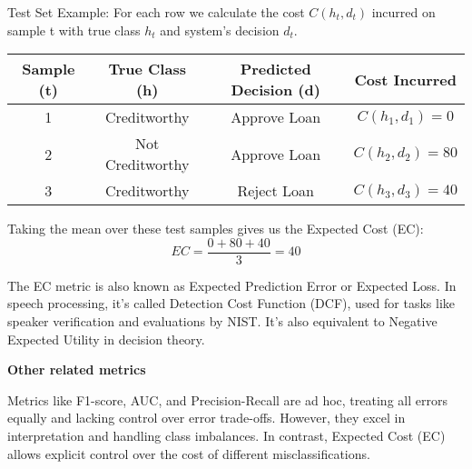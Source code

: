 Test Set Example: For each row we calculate the cost $C(h_t, d_t)$ incurred on sample t with true class $h_t$ and system’s decision $d_t$.

\begin{center}
\begin{tabular}{|c|c|c|c|}
\hline
Sample (t)& True Class (h) & Predicted Decision (d) & Cost Incurred \\
\hline
1 & Creditworthy & Approve Loan & $C(h_1, d_1) = 0$ \\
\hline
2 & Not Creditworthy & Approve Loan & $C(h_2, d_2) = 80$ \\
\hline
3 & Creditworthy & Reject Loan & $C(h_3, d_3) = 40$ \\
\hline
\end{tabular}
\end{center}

Taking the mean over these test samples gives us the Expected Cost (EC):
\[
EC = \frac{0 + 80 + 40}{3} = 40
\]

{
    The EC metric is also known as Expected Prediction Error or Expected Loss. In speech processing, it’s called Detection Cost Function (DCF), used for tasks like speaker verification and evaluations by NIST. It's also equivalent to Negative Expected Utility in decision theory.
}

\textbf{Other related metrics}

Metrics like F1-score, AUC, and Precision-Recall are ad hoc, treating all errors equally and lacking control over error trade-offs. However, they excel in interpretation and handling class imbalances. In contrast, Expected Cost (EC) allows explicit control over the cost of different misclassifications.
